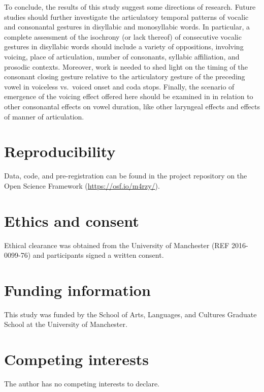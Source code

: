 \documentclass[12pt,a4paper,]{article}
\begin{document}
To conclude, the results of this study suggest some directions of
research. Future studies should further investigate the articulatory
temporal patterns of vocalic and consonantal gestures in disyllabic and
monosyllabic words. In particular, a complete assessment of the
isochrony (or lack thereof) of consecutive vocalic gestures in
disyllabic words should include a variety of oppositions, involving
voicing, place of articulation, number of consonants, syllabic
affiliation, and prosodic contexts. Moreover, work is needed to shed
light on the timing of the consonant closing gesture relative to the
articulatory gesture of the preceding vowel in voiceless vs.~voiced
onset and coda stops. Finally, the scenario of emergence of the voicing
effect offered here should be examined in in relation to other
consonantal effects on vowel duration, like other laryngeal effects and
effects of manner of articulation.

\hypertarget{reproducibility}{%
\section{Reproducibility}\label{reproducibility}}

Data, code, and pre-registration can be found in the project repository
on the Open Science Framework (\url{https://osf.io/m4rzy/}).

\hypertarget{ethics-and-consent}{%
\section{Ethics and consent}\label{ethics-and-consent}}

Ethical clearance was obtained from the University of Manchester (REF
2016-0099-76) and participants signed a written consent.

\hypertarget{funding-information}{%
\section{Funding information}\label{funding-information}}

This study was funded by the School of Arts, Languages, and Cultures
Graduate School at the University of Manchester.

\hypertarget{competing-interests}{%
\section{Competing interests}\label{competing-interests}}

The author has no competing interests to declare.


\end{document}
